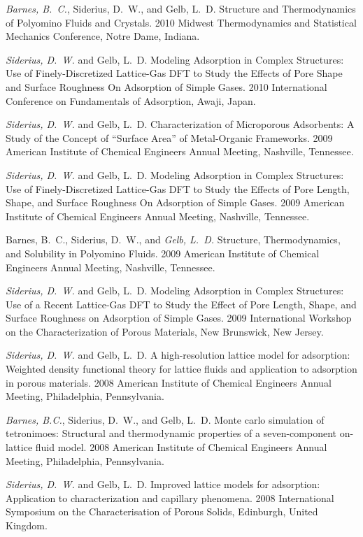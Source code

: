 {\it Barnes, B.~C.}, Siderius, D.~W., and Gelb, L.~D. Structure and Thermodynamics of Polyomino Fluids and Crystals. 2010 Midwest Thermodynamics and Statistical Mechanics Conference, Notre Dame, Indiana.

{\it Siderius, D.~W.} and Gelb, L.~D. Modeling Adsorption in Complex Structures: Use of Finely-Discretized Lattice-Gas DFT to Study the Effects of Pore Shape and Surface Roughness On Adsorption of Simple Gases. 2010 International Conference on Fundamentals of Adsorption, Awaji, Japan.

{\it Siderius, D.~W.} and Gelb, L.~D.  Characterization of Microporous Adsorbents: A Study of the Concept of ``Surface Area'' of Metal-Organic Frameworks. 2009 American Institute of Chemical Engineers Annual Meeting, Nashville, Tennessee.

{\it Siderius, D.~W.} and Gelb, L.~D. Modeling Adsorption in Complex Structures: Use of Finely-Discretized Lattice-Gas DFT to Study the Effects of Pore Length, Shape, and Surface Roughness On Adsorption of Simple Gases. 2009 American Institute of Chemical Engineers Annual Meeting, Nashville, Tennessee. 

Barnes, B.~C., Siderius, D.~W., and {\it Gelb, L.~D.}  Structure, Thermodynamics, and Solubility in Polyomino Fluids. 2009 American Institute of Chemical Engineers Annual Meeting, Nashville, Tennessee.

{\it Siderius, D.~W.} and Gelb, L.~D. Modeling Adsorption in Complex Structures: Use of a Recent Lattice-Gas DFT to Study the Effect of Pore Length, Shape, and Surface Roughness on Adsorption of Simple Gases. 2009 International Workshop on the Characterization of Porous Materials, New Brunswick, New Jersey.

{\it Siderius, D.~W.} and Gelb, L.~D. A high-resolution lattice model for adsorption: {W}eighted density functional theory for lattice fluids and application to adsorption in porous materials. 2008 American Institute of Chemical Engineers Annual Meeting, Philadelphia, Pennsylvania.

{\it Barnes, B.C.}, Siderius, D.~W., and Gelb, L.~D. Monte carlo simulation of tetronimoes: {S}tructural and thermodynamic properties of a seven-component on-lattice fluid model. 2008 American Institute of Chemical Engineers Annual Meeting, Philadelphia, Pennsylvania.

{\it Siderius, D.~W.} and Gelb, L.~D. Improved lattice models for adsorption: Application to characterization and capillary phenomena. 2008 International Symposium on the Characterisation of Porous Solids, Edinburgh, United Kingdom.

